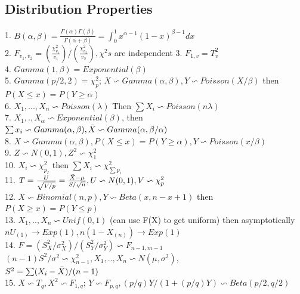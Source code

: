 \documentclass{article}
\begin{document}
\begin{multicols*}{3}
\section{Distribution Properties}

1. $B(\alpha, \beta) = \frac{\Gamma(\alpha)\Gamma(\beta)}{\Gamma(\alpha+\beta)} = \int^1_0 x^{\alpha - 1}(1-x)^{\beta - 1} dx$ \\

2. $F_{v_1,v_2} = (\frac{\chi^2_{v_1}}{v_1})/(\frac{\chi^2_{v_2}}{v_2}), \chi^2s$  are independent 
3. $F_{1,v} = T_v^2$\\

4. $Gamma(1,\beta) = Exponential(\beta)$ \\

5. $Gamma(p/2, 2) = \chi^2_p$; $X \backsim Gamma(\alpha, \beta), Y \backsim Poisson(X/\beta)$ then $P(X\le x) = P(Y \ge \alpha)$ \\

6. $X_1,...,X_n \backsim Poisson(\lambda) $  Then $\sum X_i \backsim Poisson(n\lambda)$ \\

7. $X_1,.,X_{\alpha} \backsim Exponential(\beta)$, then $\sum x_i \backsim Gamma(\alpha,\beta), \Bar{X} \backsim Gamma(\alpha, \beta/\alpha)$ \\
8. $X \backsim Gamma(\alpha, \beta), P(X \le x) = P(Y \ge \alpha), Y \backsim Poisson(x/\beta) $ \\
9. $ Z \backsim N(0,1), Z^2 \backsim \chi^2_{1}$\\
10. $ X_i \backsim \chi^2_{p_I}$ then $\sum X_i \backsim \chi^2_{\sum p_i}$\\
11. $T = \frac{U}{\sqrt{V/p}} = \frac{\Bar{X} - \mu}{S/\sqrt{n}}, U \backsim N(0,1), V \backsim \chi^2_p$\\
12. $X  \backsim Binomial(n, p), Y \backsim Beta(x, n-x+1)$ then $P(X \ge x )= P(Y \le p)$\\
13. $X_1, .., X_n \backsim Unif(0,1)$ (can use F(X) to get uniform) then asymptotically $nU_{(1)} \to Exp(1), n(1-X_{(n)}) \to Exp(1)$ \\
14. $F = (S^2_X / \sigma^2_X)/(S^2_Y / \sigma^2_Y) \backsim F_{n-1,m-1}$\\
$(n-1)S^2/\sigma^2 \backsim \chi^2_{n-1}, X_1,..,X_n\backsim N(\mu,\sigma^2)$,\\ $S^2 = \sum(X_i - \Bar{X})/(n-1)$\\
15. $X \backsim T_q, X^2 \backsim F_{1, q}$; $Y \backsim F_{p,q}, (p/q)Y/(1 + (p/q)Y) \backsim Beta(p/2, q/2)$


\end{multicols*}
\end{document}
